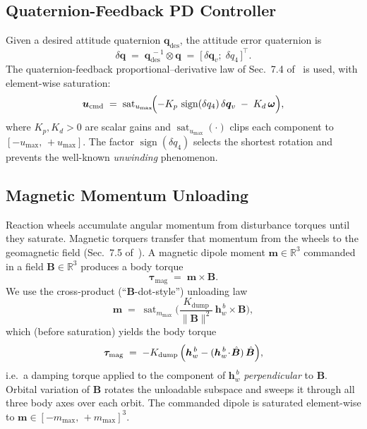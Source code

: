 \subsection{Quaternion-Feedback PD Controller}
\label{sec:pd-controller}

Given a desired attitude quaternion $\bm{q}_{\text{des}}$, the attitude
error quaternion is
\begin{equation}
\delta\bm{q} \;=\; \bm{q}_{\text{des}}^{\,-1} \otimes \bm{q}
\;=\; \bigl[\,\delta\bm{q}_v;\; \delta q_4\,\bigr]^{\!\top}.
\end{equation}
The quaternion-feedback proportional--derivative law of Sec.~7.4
of~\cite{markley2014} is used, with element-wise saturation:
\begin{equation}
\bm{u}_{\text{cmd}} \;=\;
\operatorname{sat}_{u_{\max}}\!\Bigl(
 -K_p\,\operatorname{sign}(\delta q_4)\,\delta\bm{q}_v
 \;-\; K_d\,\bm{\omega}
\Bigr),
\label{eq:pd}
\end{equation}
where $K_p, K_d > 0$ are scalar gains and
$\operatorname{sat}_{u_{\max}}(\cdot)$ clips each component to
$[-u_{\max},\, +u_{\max}]$. The factor
$\operatorname{sign}(\delta q_4)$ selects the shortest rotation and
prevents the well-known \emph{unwinding} phenomenon.


\subsection{Magnetic Momentum Unloading}
\label{sec:bdot}

Reaction wheels accumulate angular momentum from disturbance torques
until they saturate. Magnetic torquers transfer that momentum from the
wheels to the geomagnetic field (Sec.~7.5 of~\cite{markley2014}). A
magnetic dipole moment $\bm{m}\in\mathbb{R}^{3}$ commanded in a field
$\bm{B}\in\mathbb{R}^{3}$ produces a body torque
\begin{equation}
\bm{\tau}_{\text{mag}} \;=\; \bm{m}\times\bm{B}.
\end{equation}
We use the cross-product (``$\bm{B}$-dot-style'') unloading law
\begin{equation}
\bm{m} \;=\;
\operatorname{sat}_{m_{\max}}\!\biggl(
\frac{K_{\text{dump}}}{\|\bm{B}\|^{2}}\,
 \bm{h}_w^{\,b} \times \bm{B}
\biggr),
\label{eq:bdot}
\end{equation}
which (before saturation) yields the body torque
\begin{equation}
\bm{\tau}_{\text{mag}}
\;=\;
-K_{\text{dump}}\,
\Bigl(\bm{h}_w^{\,b} - (\bm{h}_w^{\,b}\!\cdot\!\hat{\bm{B}})\,\hat{\bm{B}}\Bigr),
\end{equation}
i.e.\ a damping torque applied to the component of $\bm{h}_w^{\,b}$
\emph{perpendicular} to $\bm{B}$. Orbital variation of $\bm{B}$ rotates
the unloadable subspace and sweeps it through all three body axes over
each orbit. The commanded dipole is saturated element-wise to
$\bm{m}\in[-m_{\max},\,+m_{\max}]^{3}$.

